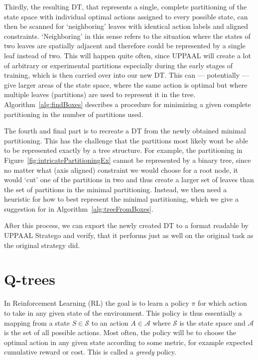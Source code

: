 \documentclass{article}
\begin{document}
Thirdly, the resulting DT, that represents a single, complete partitioning of
the state space with individual optimal actions assigned to every possible
state, can then be scanned for `neighboring' leaves with identical action
labels and aligned constraints. `Neighboring' in this sense refers to the
situation where the states of two leaves are spatially adjacent and therefore
could be represented by a single leaf instead of two. This will happen quite
often, since UPPAAL will create a lot of arbitrary or experimental partitions
especially during the early stages of training, which is then carried over into
our new DT\@. This can --- potentially --- give larger areas of the state space,
where the same action is optimal but where multiple leaves (partitions) are used
to represent it in the tree. Algorithm~\ref{alg:findBoxes} describes a procedure
for minimizing a given complete partitioning in the number of partitions used.

The fourth and final part is to recreate a DT from the newly obtained
minimal partitioning. This has the challenge that the partitions most likely
wont be able to be represented exactly by a tree structure. For example, the
partitioning in Figure~\ref{fig:intricatePartitioningEx} cannot be represented
by a binary tree, since no matter what (axis aligned) constraint we would choose
for a root node, it would `cut' one of the partitions in two and thus create a
larger set of leaves than the set of partitions in the minimal partitioning.
Instead, we then need a heuristic for how to best represent the minimal
partitioning, which we give a suggestion for in
Algorithm~\ref{alg:treeFromBoxes}.

After this process, we can export the newly created DT to a format readable by
UPPAAL Stratego and verify, that it performs just as well on the original task
as the original strategy did.


\section{Q-trees}%
\label{sec:qTrees}


In Reinforcement Learning (RL) the goal is to learn a policy $\pi$ for which
action to take in any given state of the environment. This policy is thus
essentially a mapping from a state $S \in \mathcal{S}$ to an action $A \in
\mathcal{A}$ where $\mathcal{S}$ is the state space and $\mathcal{A}$ is the set
of all possible actions. Most often, the policy will be to choose the optimal
action in any given state according to some metric, for example expected
cumulative reward or cost. This is called a \textit{greedy} policy.
\end{document}
